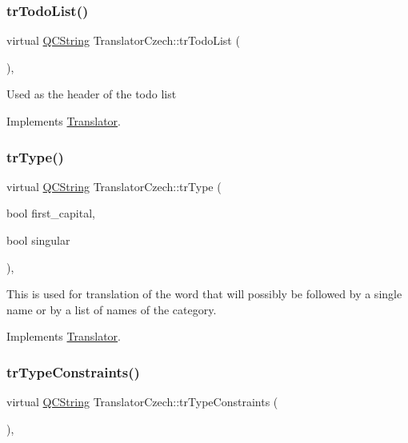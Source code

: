 \subsubsection{\texorpdfstring{trTodoList()}{trTodoList()}}
{\footnotesize\ttfamily virtual \mbox{\hyperlink{class_q_c_string}{Q\+C\+String}} Translator\+Czech\+::tr\+Todo\+List (\begin{DoxyParamCaption}{ }\end{DoxyParamCaption})\hspace{0.3cm}{\ttfamily [inline]}, {\ttfamily [virtual]}}

Used as the header of the todo list 

Implements \mbox{\hyperlink{class_translator}{Translator}}.

\mbox{\label{class_translator_czech_a1d323e601b7a72f042154d7f3fda9593}} 
\subsubsection{\texorpdfstring{trType()}{trType()}}
{\footnotesize\ttfamily virtual \mbox{\hyperlink{class_q_c_string}{Q\+C\+String}} Translator\+Czech\+::tr\+Type (\begin{DoxyParamCaption}\item[{bool}]{first\+\_\+capital,  }\item[{bool}]{singular }\end{DoxyParamCaption})\hspace{0.3cm}{\ttfamily [inline]}, {\ttfamily [virtual]}}

This is used for translation of the word that will possibly be followed by a single name or by a list of names of the category. 

Implements \mbox{\hyperlink{class_translator}{Translator}}.

\mbox{\label{class_translator_czech_afd3fc41092b7463f0f832e3662366288}} 
\subsubsection{\texorpdfstring{trTypeConstraints()}{trTypeConstraints()}}
{\footnotesize\ttfamily virtual \mbox{\hyperlink{class_q_c_string}{Q\+C\+String}} Translator\+Czech\+::tr\+Type\+Constraints (\begin{DoxyParamCaption}{ }\end{DoxyParamCaption})\hspace{0.3cm}{\ttfamily [inline]}, {\ttfamily [virtual]}}

